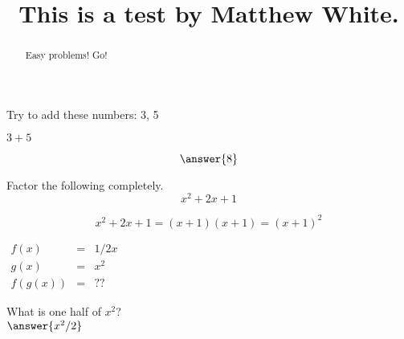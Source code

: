 \documentclass{ximera}
\title{This is a test by Matthew White.}
\begin{document}
	\begin{abstract}
		Easy problems! Go!
	\end{abstract}
	\maketitle
	
	
\begin{question}
	Try to add these numbers: 3, 5\\
	\begin{hint}
		$3 + 5$
		\end{hint}
	$$\answer{8}$$
\end{question}

	
  \begin{question}
  		Factor the following completely.\\
  		$$ x^2 + 2x + 1 $$ 
  		\begin{hint}
  			$$ x^2 + 2x + 1 = (x + 1)(x + 1) = (x + 1)^2 $$
  		\end{hint}
  		\begin{prompt}
  			\begin{multipleChoice}
  			\end{multipleChoice}
  		\end{prompt}
  \end{question}

	\begin{question}
		\begin{hint}
			$\begin{array}{rcl}f(x) & = & 1/2 x\\
			g(x) & = & x^2\\
			f(g(x)) & = & ??
			\end{array}$
			\end{hint}
		What is one half of $x^2$?\\
		$	\answer{x^2/2}$
	\end{question}

	
\end{document}
